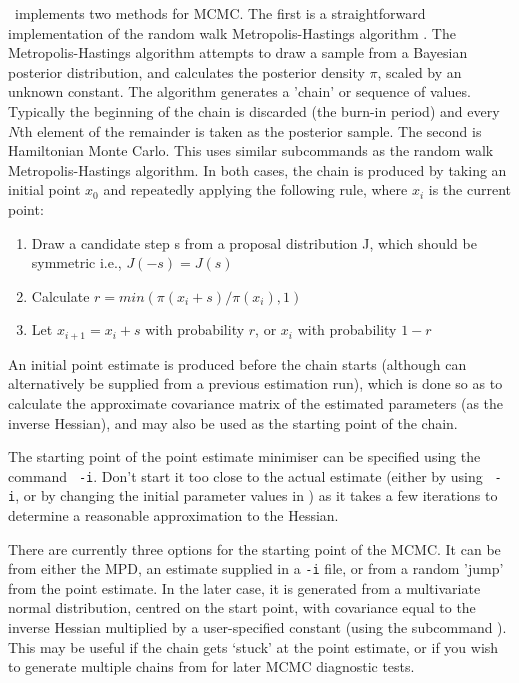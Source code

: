 \CNAME\ implements two methods for MCMC. The first is a straightforward implementation of the random walk Metropolis-Hastings algorithm \citep{823,143}. The Metropolis-Hastings algorithm attempts to draw a sample from a Bayesian posterior distribution, and calculates the posterior density $\pi$, scaled by an unknown constant. The algorithm generates a 'chain' or sequence of values. Typically the beginning of the chain is discarded (the burn-in period) and every $N$th element of the remainder is taken as the posterior sample. The second is Hamiltonian Monte Carlo. This uses similar subcommands as the random walk Metropolis-Hastings algorithm. In both cases, the chain is produced by taking an initial point $x_0$ and repeatedly applying the following rule, where $x_i$ is the current point:

\begin{enumerate}
\item Draw a candidate step s from a proposal distribution J, which should be symmetric i.e., $J(-s)=J(s)$
\item Calculate $r=min(\pi(x_i+s)/\pi(x_i),1)$
\item Let $x_{i+1}=x_i+s$ with probability $r$, or $x_i$ with probability $1-r$
\end{enumerate}

An initial point estimate is produced before the chain starts (although can alternatively be supplied from a previous estimation run), which is done so as to calculate the approximate covariance matrix of the estimated parameters (as the inverse Hessian), and may also be used as the starting point of the chain.

The starting point of the point estimate minimiser can be specified using the command \texttt{\cname\ -i}. Don't start it too close to the actual estimate (either by using \texttt{\cname\ -i}, or by changing the initial parameter values in \config) as it takes a few iterations to determine a reasonable approximation to the Hessian.

There are currently three options for the starting point of the MCMC. It can be from either the MPD, an estimate supplied in a \texttt{-i} file, or from a random 'jump' from the point estimate. In the later case, it is generated from a multivariate normal distribution, centred on the start point, with covariance equal to the inverse Hessian multiplied by a user-specified constant (using the subcommand ). This may be useful if the chain gets `stuck' at the point estimate, or if you wish to generate multiple chains from for later MCMC diagnostic tests. 

